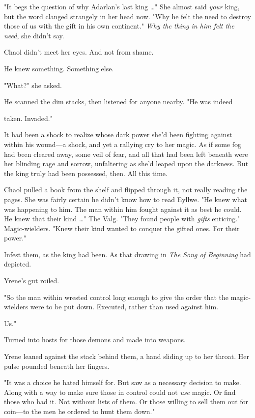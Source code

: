 "It begs the question of why Adarlan's last king \ldots" She almost said \emph{your} king, but the word clanged strangely in her head now. "Why he felt the need to destroy those of us with the gift in his own continent." \emph{Why the thing in him felt the need}, she didn't say.

Chaol didn't meet her eyes. And not from shame.

He knew something. Something else.

"What?" she asked.

He scanned the dim stacks, then listened for anyone nearby. "He was indeed

 taken. Invaded."

It had been a shock to realize whose dark power she'd been fighting against within his wound---a shock, and yet a rallying cry to her magic. As if some fog had been cleared away, some veil of fear, and all that had been left beneath were her blinding rage and sorrow, unfaltering as she'd leaped upon the darkness. But  the king truly had been possessed, then. All this time.

Chaol pulled a book from the shelf and flipped through it, not really reading the pages. She was fairly certain he didn't know how to read Eyllwe. "He knew what was happening to him. The man within him fought against it as best he could. He knew that their kind \ldots" The Valg. "They found people with \emph{gifts}  enticing." Magic-wielders. "Knew their kind wanted to conquer the gifted ones. For their power."

Infest them, as the king had been. As that drawing in \emph{The Song of Beginning} had depicted.

Yrene's gut roiled.

"So the man within wrested control long enough to give the order that the magic-wielders were to be put down. Executed, rather than used against him.

Us."

Turned into hosts for those demons and made into weapons.

Yrene leaned against the stack behind them, a hand sliding up to her throat. Her pulse pounded beneath her fingers.

"It was a choice he hated himself for. But saw as a necessary decision to make. Along with a way to make sure those in control could not
\emph{use} magic. Or find those who had it. Not without lists of them. Or those willing to sell them out for coin---to the men he ordered to hunt them down."

